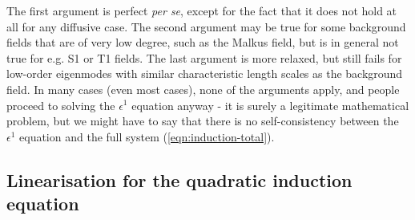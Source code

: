 The first argument is perfect \textit{per se}, except for the fact that it does not hold at all for any diffusive case.
The second argument may be true for some background fields that are of very low degree, such as the Malkus field, but is in general not true for e.g. S1 or T1 fields.
The last argument is more relaxed, but still fails for low-order eigenmodes with similar characteristic length scales as the background field. In many cases (even most cases), none of the arguments apply, and people proceed to solving the $\epsilon^1$ equation anyway - it is surely a legitimate mathematical problem, but we might have to say that there is no self-consistency between the $\epsilon^1$ equation and the full system (\ref{eqn:induction-total}).


\subsection{Linearisation for the quadratic induction equation}

